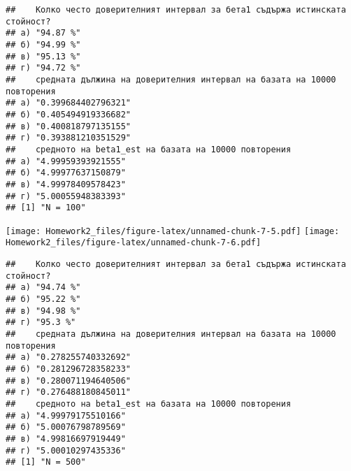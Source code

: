 \documentclass[
]{article}
\begin{document}
\begin{verbatim}
##    Колко често доверителният интервал за бета1 съдържа истинската стойност?
## а) "94.87 %"                                                               
## б) "94.99 %"                                                               
## в) "95.13 %"                                                               
## г) "94.72 %"                                                               
##    средната дължина на доверителния интервал на базата на 10000 повторения
## а) "0.399684402796321"                                                    
## б) "0.405494919336682"                                                    
## в) "0.400818797135155"                                                    
## г) "0.393881210351529"                                                    
##    средното на beta1_est на базата на 10000 повторения
## а) "4.99959393921555"                                 
## б) "4.99977637150879"                                 
## в) "4.99978409578423"                                 
## г) "5.00055948383393"                                 
## [1] "N = 100"
\end{verbatim}

\texttt{[image: Homework2\_files/figure-latex/unnamed-chunk-7-5.pdf]}
\texttt{[image: Homework2\_files/figure-latex/unnamed-chunk-7-6.pdf]}

\begin{verbatim}
##    Колко често доверителният интервал за бета1 съдържа истинската стойност?
## а) "94.74 %"                                                               
## б) "95.22 %"                                                               
## в) "94.98 %"                                                               
## г) "95.3 %"                                                                
##    средната дължина на доверителния интервал на базата на 10000 повторения
## а) "0.278255740332692"                                                    
## б) "0.281296728358233"                                                    
## в) "0.280071194640506"                                                    
## г) "0.276488180845011"                                                    
##    средното на beta1_est на базата на 10000 повторения
## а) "4.99979175510166"                                 
## б) "5.00076798789569"                                 
## в) "4.99816697919449"                                 
## г) "5.00010297435336"                                 
## [1] "N = 500"
\end{verbatim}
\end{document}

